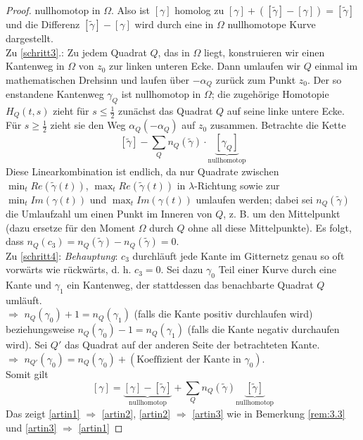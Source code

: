 \documentclass[11pt,titlepage]{article}
\theoremstyle{definition}
\theoremstyle{remark}
\begin{document}
\begin{proof}
		nullhomotop in $\Omega$. Also ist $[\gamma]$ homolog zu $[\gamma]+([\tilde{\gamma}]-[\gamma])= 
		[\tilde{\gamma}]$ und die Differenz $[\tilde{\gamma}]-[\gamma]$ wird durch eine in $\Omega$ 
		nullhomotope Kurve dargestellt. \\
		Zu \ref{schritt3}.: Zu jedem Quadrat $Q$, das in $\Omega$ liegt, konstruieren wir einen Kantenweg in $
		\Omega$ von $z_0$ zur linken unteren Ecke. Dann umlaufen wir $Q$ einmal im mathematischen 
		Drehsinn und laufen über $-\alpha_Q$ zurück zum Punkt $z_0$. Der so enstandene Kantenweg 
		$\gamma_Q$ ist nullhomotop in $\Omega$; die zugehörige Homotopie $H_Q(t,s)$ zieht für 
		$s\leq\frac{1}{2}$ zunächst das Quadrat $Q$ auf seine linke untere Ecke. Für $s\geq \frac{1}{2}$ 
		zieht sie den Weg $\alpha_Q (-\alpha_Q)$ auf $z_0$ zusammen. Betrachte die Kette 
		\[ [\tilde{\gamma}]-\sum_Q n_Q (\tilde{\gamma})\cdot \underbrace{[\gamma_Q]}_{\text{nullhomotop}} \]
		Diese Linearkombination ist endlich, da nur Quadrate zwischen $\min_t Re(\tilde{\gamma}(t))$, 
		$\max_t Re(\tilde{\gamma}(t))$ in $\lambda$-Richtung sowie zur $\min_t Im(\gamma(t))$ und 
		$\max_t Im(\gamma(t))$ umlaufen werden; dabei sei $n_Q(\tilde{\gamma})$ die Umlaufzahl 
		um einen Punkt im Inneren von $Q$, z. B. um den Mittelpunkt (dazu ersetze für den Moment 
		$\Omega$ durch $Q$ ohne all diese Mittelpunkte). Es folgt, dass $n_Q (c_3)=n_Q(\tilde{\gamma})-
		n_Q(\tilde{\gamma})=0$. \\
		Zu \ref{schritt4}: \textsl{Behauptung}: $c_3$ durchläuft jede Kante im Gitternetz genau so oft 
		vorwärts wie rückwärts, d. h. $c_3=0$. Sei dazu $\gamma_0$ Teil einer Kurve durch eine Kante und 
		$\gamma_1$ ein Kantenweg, der stattdessen das benachbarte Quadrat $Q$ umläuft. \\
		$\Rightarrow$ $n_Q(\gamma_0)+1=n_Q(\gamma_1)$ (falls die Kante positiv durchlaufen wird) 
		beziehungsweise $n_Q(\gamma_0)-1=n_Q(\gamma_1)$ (falls die Kante negativ durchaufen wird).
		Sei $Q'$ das Quadrat auf der anderen Seite der betrachteten Kante. \\
		$\Rightarrow$ $n_{Q'}(\gamma_0)=n_Q(\gamma_0)+(\text{Koeffizient der Kante in }\gamma_0)$. \\
		Somit gilt 
		\[ [\gamma]=\underbrace{[\gamma]-[\tilde{\gamma}]}_{\text{nullhomotop}}+\sum_Q n_Q (\tilde{\gamma})
		\underbrace{[\tilde{\gamma}]}_{\text{nullhomotop}} \]
		Das zeigt \ref{artin1} $\Rightarrow$ \ref{artin2}, \ref{artin2} $\Rightarrow$ \ref{artin3} wie in 
		Bemerkung \ref{rem:3.3} und \ref{artin3} $\Rightarrow$ \ref{artin1}
	\end{proof}
	
\end{document}
